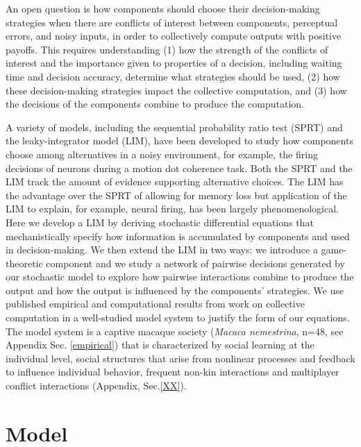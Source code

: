 \documentclass{pnastwo}
\begin{document}
\begin{article}
An open question is how components should choose their decision-making strategies when there are conflicts of interest between components, perceptual errors, and noisy inputs, in order to collectively compute outputs with positive payoffs. This requires understanding (1) how the strength of the  conflicts of interest and the importance given to properties of a decision, including waiting time and decision accuracy, determine what strategies should be used, (2) how these decision-making strategies impact the collective computation, and (3) how the decisions of the components combine to produce the computation. 

A variety of models, including the sequential probability ratio test (SPRT) and the leaky-integrator model (LIM), have been developed to study how components choose among alternatives in a noisy environment, for example, the firing decisions of neurons during a motion dot coherence task. Both the SPRT and the LIM track the amount of evidence supporting alternative choices. The LIM has the advantage over the SPRT of allowing for memory loss but application of the LIM to explain, for example, neural firing, has been largely phenomenological. Here we develop a LIM by deriving stochastic differential equations that mechanistically specify how information is accumulated by components and used in decision-making. We then extend the LIM in two ways: we introduce a game-theoretic component and we study a network of pairwise decisions generated by our stochastic model to explore how pairwise interactions combine to produce the output and how the output is influenced by the components' strategies. We use published empirical and computational results from work on collective computation in a well-studied model system to justify the form of our equations. The model system is a captive macaque society (\emph{Macaca nemestrina}, n=48, see Appendix Sec. \ref{empirical}) that is characterized by 
social learning at the individual level, social structures that arise from nonlinear processes and feedback to influence individual behavior, frequent non-kin interactions and multiplayer conflict interactions 
(Appendix, Sec.\ref{XX})\cite {Flack:2007ir, Flack:2006jh, Flack:2006vi, Flack:2005ih, Flack:2005dg, Thierry:2004tj}. 

\section{Model}

\end{article}
\end{document}
